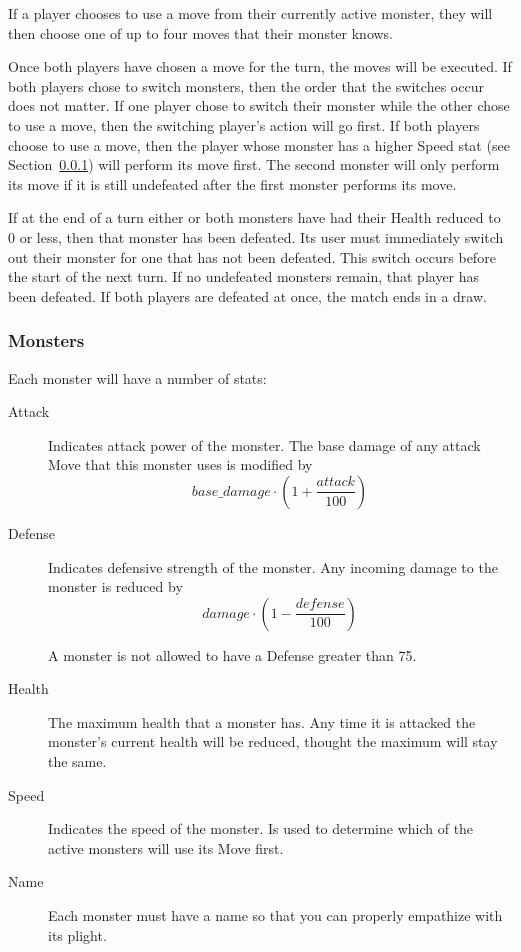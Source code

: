 \documentclass[11pt]{cselabheader}
\begin{document}
If a player chooses to use a move from their currently active monster, they will
then choose one of up to four moves that their monster knows.

Once both players have chosen a move for the turn, the moves will be executed.
If both players chose to switch monsters, then the order that the switches occur
does not matter. If one player chose to switch their monster while the other chose
to use a move, then the switching player's action will go first. If both players
choose to use a move, then the player whose monster has a higher Speed stat (see
Section~\ref{subsubsec:monster}) will perform its move first. The second monster
will only perform its move if it is still undefeated after the first monster
performs its move.

If at the end of a turn either or both monsters have had their Health reduced to 0
or less, then that monster has been defeated. Its user must immediately switch out
their monster for one that has not been defeated. This switch occurs before the start
of the next turn. If no undefeated monsters remain, that player has been defeated.
If both players are defeated at once, the match ends in a draw.

\subsubsection{Monsters}
\label{subsubsec:monster}  
Each monster will have a number of stats:
\begin{description}
\item[Attack] Indicates attack power of the monster. The base damage of any attack
  Move that this monster uses is modified by $$base\_damage \cdot \left(1 +
  \frac{attack}{100}\right)$$
\item[Defense] Indicates defensive strength of the monster. Any incoming damage to
  the monster is reduced by $$damage \cdot \left(1 - \frac{defense}{100}\right)$$

  A monster is not allowed to have a Defense greater than 75.
\item[Health] The maximum health that a monster has. Any time it is attacked the
  monster's current health will be reduced, thought the maximum will stay the same.
\item[Speed] Indicates the speed of the monster. Is used to determine which of the
  active monsters will use its Move first.
\item[Name] Each monster must have a name so that you can properly empathize with
  its plight.
\end{description}
\end{document}
